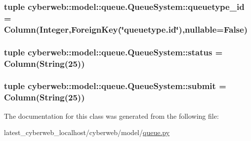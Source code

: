 \hypertarget{classcyberweb_1_1model_1_1queue_1_1_queue_system_ac2bd5fbdb30147bd7b26eaf4182046cd}{
\subsubsection[{queuetype\-\_\-id}]{\setlength{\rightskip}{0pt plus 5cm}tuple {\bf cyberweb\-::model\-::queue.\-Queue\-System\-::queuetype\-\_\-id} = \-Column(\-Integer,\-Foreign\-Key(\char`\"{}queuetype.\-id\char`\"{}),nullable=\-False)}}\label{classcyberweb_1_1model_1_1queue_1_1_queue_system_ac2bd5fbdb30147bd7b26eaf4182046cd}
\hypertarget{classcyberweb_1_1model_1_1queue_1_1_queue_system_a03a12c5b446e1b4914591772bf0442a7}{
\subsubsection[{status}]{\setlength{\rightskip}{0pt plus 5cm}tuple {\bf cyberweb\-::model\-::queue.\-Queue\-System\-::status} = \-Column(\-String(25))}}\label{classcyberweb_1_1model_1_1queue_1_1_queue_system_a03a12c5b446e1b4914591772bf0442a7}
\hypertarget{classcyberweb_1_1model_1_1queue_1_1_queue_system_a1201392160b3a4b9e7d895389174a01e}{
\subsubsection[{submit}]{\setlength{\rightskip}{0pt plus 5cm}tuple {\bf cyberweb\-::model\-::queue.\-Queue\-System\-::submit} = \-Column(\-String(25))}}\label{classcyberweb_1_1model_1_1queue_1_1_queue_system_a1201392160b3a4b9e7d895389174a01e}


\-The documentation for this class was generated from the following file\-:\begin{DoxyCompactItemize}
\item 
latest\-\_\-cyberweb\-\_\-localhost/cyberweb/model/\hyperlink{queue_8py}{queue.\-py}\end{DoxyCompactItemize}
